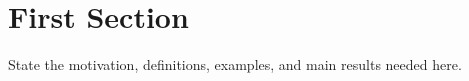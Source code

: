\section{First Section}
\label{xx:sec:first-section}

State the motivation, definitions, examples, and main results needed here.
